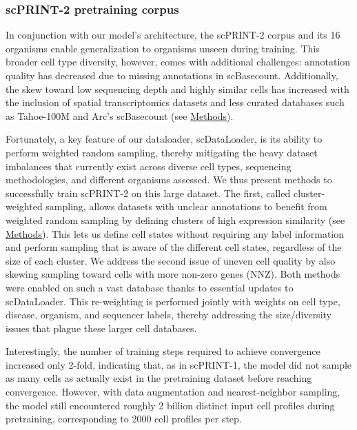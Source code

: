 \subsubsection{scPRINT-2 pretraining
corpus}\label{scprint-2-pretraining-corpus}

In conjunction with our model's architecture, the \gls{scPRINT}-2 corpus and
its 16 organisms enable generalization to organisms unseen during
training. This broader cell type diversity, however, comes with
additional challenges: annotation quality has decreased due to missing
annotations in scBasecount. Additionally, the skew toward low sequencing
depth and highly similar cells has increased with the inclusion of
spatial transcriptomics datasets and less curated databases such as
Tahoe-100M and Arc's scBasecount (see
\hyperref[depth-weighted-sampling]{Methods}).

Fortunately, a key feature of our dataloader,
scDataLoader\citep{scprint}, is its ability to perform weighted
random sampling, thereby mitigating the heavy dataset imbalances that
currently exist across diverse cell types, sequencing methodologies, and
different organisms assessed. We thus present methods to successfully
train \gls{scPRINT}-2 on this large dataset. The first, called
cluster-weighted sampling, allows datasets with unclear annotations to
benefit from weighted random sampling by defining clusters of high
expression similarity (see
\hyperref[cluster-weighted-sampling]{Methods}). This lets us define
cell states without requiring any label information and perform sampling
that is aware of the different cell states, regardless of the size of
each cluster. We address the second issue of uneven cell quality by also
skewing sampling toward cells with more non-zero genes (\gls{NNZ}). Both
methods were enabled on such a vast database thanks to essential updates
to scDataLoader. This re-weighting is performed jointly with weights on
cell type, disease, organism, and sequencer labels, thereby addressing
the size/diversity issues that plague these larger cell
databases\citep{alsabbaghFoundationModelsMeet2023}.

Interestingly, the number of training steps required to achieve
convergence increased only 2-fold, indicating that, as in \gls{scPRINT}-1, the
model did not sample as many cells as actually exist in the pretraining
dataset before reaching convergence. However, with data augmentation and
nearest-neighbor sampling, the model still encountered roughly 2 billion
distinct input cell profiles during pretraining, corresponding to 2000
cell profiles per step.


